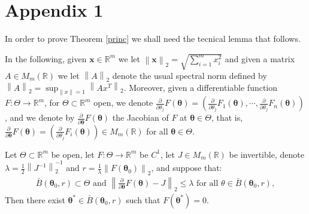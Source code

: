 \documentclass[lineno]{biometrika}
\newcommand{\R}{\mathbb{R}}
\newcommand{\bs}{\boldsymbol}
\begin{document}
\appendix

\appendixone
\section*{Appendix 1}



In order to prove Theorem \ref{princ} we shall need the tecnical lemma that follows.

In the following, given $\bs{x}\in \R^m$ we let $\left\|\bs{x}\right\|_2=\sqrt{\sum_{i=1}^m x_i^2}$ and given a matrix $A\in M_m(\R)$ we let $\left\|A\right\|_2$ denote the usual spectral norm defined by $\left\|A\right\|_2=\sup_{\left\|x\right\|=1}\left\|Ax^T\right\|_2$. Moreover, given a differentiable function $F:\Theta\to \mathbb{R}^m$, for $\Theta\subset \mathbb{R}^m$ open, we denote $\frac{\partial}{\partial \theta_j} F(\bs{\theta})=\left(\frac{\partial}{\partial \theta_j} F_1 (\bs{\theta}),\cdots,  \frac{\partial}{\partial \theta_j} F_n (\bs{\theta})\right)$, and we denote
 by $\frac{\partial}{\partial \bs{\theta}} F(\bs{\theta})$ the Jacobian of $F$ at $\bs{\theta}\in \Theta$, that is, $\frac{\partial}{\partial \bs{\theta}} F(\bs{\theta})=\left(\frac{\partial}{\partial \theta_j} F_i (\bs{\theta})\right)\in M_m(\mathbb{R})$ for all $\bs{\theta}\in \Theta$.
 
\begin{lemma}\label{clemma} Let $\Theta\subset \mathbb{R}^m$ be open, let $F:\Theta\to \mathbb{R}^m$ be $C^1$, let $J\in  M_m(\mathbb{R})$ be invertible, denote $\lambda = \frac{1}{2} \left\|J^{-1}\right\|_2^{-1}$ and $r=\frac{1}{\lambda}\left\|F(\bs{\theta}_0)\right\|_2$, and suppose that:
\begin{equation*}
\begin{aligned}\bar{B}(\bs{\theta}_0,r)\subset \Theta\mbox{ and }
\left\|\frac{\partial}{\partial \bs{\theta}} F(\bs{\theta})-J\right\|_2\leq \lambda \mbox{ for all }\theta\in \bar{B}(\bs{\theta}_0,r),
\end{aligned}
\end{equation*}
Then there exist $\bs{\theta}^*\in \bar{B}(\bs{\theta}_0,r)$ such that $F(\bs{\theta}^*)=0$.
\end{lemma}
\end{document}
